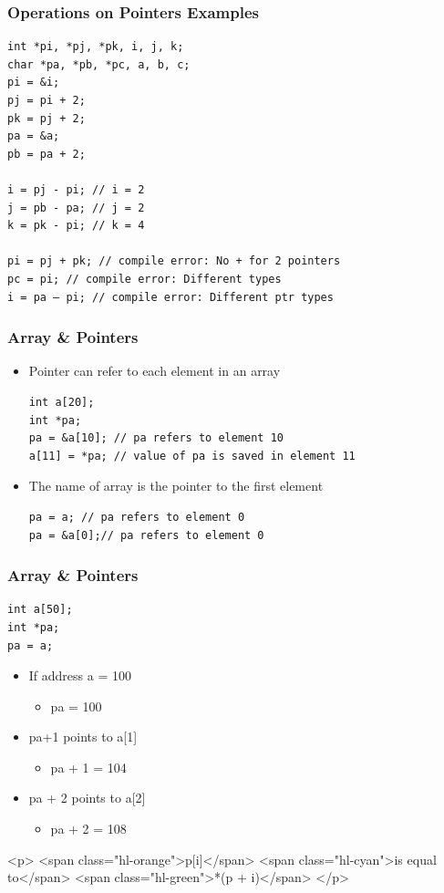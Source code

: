 \documentclass{../c-lecture}
\begin{document}
\begin{frame}[fragile]
  \frametitle{Operations on Pointers Examples}
  \begin{verbatim}
int *pi, *pj, *pk, i, j, k;
char *pa, *pb, *pc, a, b, c;
pi = &i;
pj = pi + 2;
pk = pj + 2;
pa = &a;
pb = pa + 2;

i = pj - pi; // i = 2
j = pb - pa; // j = 2
k = pk - pi; // k = 4

pi = pj + pk; // compile error: No + for 2 pointers
pc = pi; // compile error: Different types
i = pa – pi; // compile error: Different ptr types
  \end{verbatim}
\end{frame}

\begin{frame}[fragile]
  \frametitle{Array \& Pointers}
  \begin{itemize}
    \item Pointer can refer to each element in an array
    \begin{verbatim}
int a[20];
int *pa;
pa = &a[10]; // pa refers to element 10
a[11] = *pa; // value of pa is saved in element 11
    \end{verbatim}
    \item The name of array is the pointer to the first element
    \begin{verbatim}
pa = a; // pa refers to element 0
pa = &a[0];// pa refers to element 0
    \end{verbatim}
  \end{itemize}
\end{frame}

\begin{frame}[fragile]
  \frametitle{Array \& Pointers}
  \begin{verbatim}
int a[50];
int *pa;
pa = a;
  \end{verbatim}
  \begin{itemize}
    \item If address a = 100
    \begin{itemize}
      \item pa = 100
    \end{itemize}
    \item pa+1 points to a[1]
    \begin{itemize}
      \item pa + 1 = 104
    \end{itemize}
    \item pa + 2 points to a[2]
    \begin{itemize}
      \item pa + 2 = 108
    \end{itemize}
  \end{itemize}
  <p>
    <span class="hl-orange">p[i]</span>
    <span class="hl-cyan">is equal to</span>
    <span class="hl-green">*(p + i)</span>
  </p>
\end{frame}
\end{document}
